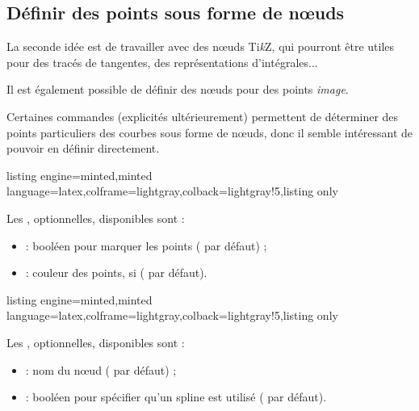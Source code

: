 \documentclass[11pt,a4paper]{ltxdoc}
\providecommand\tikzlogo{Ti\textit{k}Z}
\let\TikZ\tikzlogo
\begin{document}
\pagebreak

\subsection{Définir des points sous forme de nœuds}\label{defpts}

La seconde idée est de travailler avec des nœuds \TikZ, qui pourront être utiles pour des tracés de tangentes, des représentations d'intégrales$\ldots$

\smallskip

Il est également possible de définir des nœuds pour des points \textit{image}.

\smallskip

Certaines commandes (explicités ultérieurement) permettent de déterminer des points particuliers des courbes sous forme de nœuds, donc il semble intéressant de pouvoir en définir directement.

\begin{tcblisting}{listing engine=minted,minted language=latex,colframe=lightgray,colback=lightgray!5,listing only}
\end{tcblisting}

Les \MontreCode{[clés]}, optionnelles, disponibles sont :

\smallskip

\begin{itemize}
	\item {} : booléen pour marquer les points ( par défaut) ;
	\item {} : couleur des points, si  ( par défaut).
\end{itemize}

\begin{tcblisting}{listing engine=minted,minted language=latex,colframe=lightgray,colback=lightgray!5,listing only}
\end{tcblisting}

Les \MontreCode{[clés]}, optionnelles, disponibles sont :

\smallskip

\begin{itemize}
	\item {} : nom du nœud ( par défaut) ;
	\item {} : booléen pour spécifier qu'un spline est utilisé ( par défaut).
\end{itemize}
\end{document}
